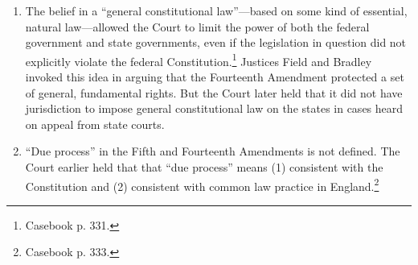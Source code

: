 \begin{enumerate}
\begin{enumerate}
        be abused.''\footnote{Casebook p. 330.}
        \item States are sometimes (often?) more oppressive than the federal 
        government---contrary to the founders' fears.
    \end{enumerate}
    \item The belief in a ``general constitutional law''---based on some kind 
    of essential, natural law---allowed the Court to limit the power of both 
    the federal government and state governments, even if the legislation in 
    question did not explicitly violate the federal 
    Constitution.\footnote{Casebook p.  331.} Justices Field and Bradley 
    invoked this idea in arguing that the Fourteenth Amendment protected a set 
    of general, fundamental rights. But the Court later held that it did not 
    have jurisdiction to impose general constitutional law on the states in 
    cases heard on appeal from state courts.
    \item ``Due process'' in the Fifth and Fourteenth Amendments is not 
    defined. The Court earlier held that that ``due process'' means (1) 
    consistent with the Constitution and (2) consistent with common law 
    practice in England.\footnote{Casebook p. 333.}
\end{enumerate}

